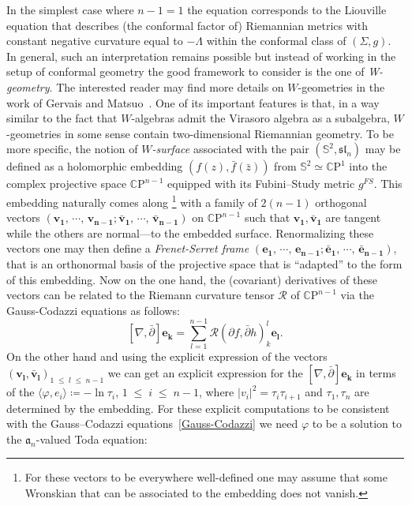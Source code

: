 \documentclass[10pt]{amsart}
\theoremstyle{definition}\newtheorem{defi}[theo]{Definition}\newtheorem{rema}[theo]{Remark}\newtheorem{exam}[theo]{Example}\newtheorem{exem}[theo]{Example}\newtheorem{nota}[theo]{Notation}
\renewcommand{\leq}{\;\leqslant\;}
\newcommand{\frksl}{\mathfrak{sl}}
\newcommand{\frka}{\mathfrak{a}}
\newcommand{\rmP}{\mathrm{P}}
\newcommand{\clR}{\mathcal{R}}
\newcommand{\C}{\mathbb{C}}
\renewcommand*\S{\mathbb{S}}
\newcommand{\ps}[1]{\langle #1 \rangle}
\newcommand{\norm}[1]{\left\lvert#1\right\rvert}
\begin{document}
In the simplest case where $n-1=1$ the equation corresponds to the Liouville equation that describes (the conformal factor of) Riemannian metrics with constant negative curvature equal to $-\Lambda$ within the conformal class of $(\Sigma,g)$. In general, such an interpretation remains possible but instead of working in the setup of conformal geometry the good framework to consider is the one of \emph{W-geometry}. The interested reader may find more details on $W$-geometries in the work of Gervais and Matsuo~\cite{GeMa92}. One of its important features is that, in a way similar to the fact that $W$-algebras admit the Virasoro algebra as a subalgebra, $W$-geometries in some sense contain two-dimensional Riemannian geometry. To be more specific, the notion of \emph{$W$-surface} associated with the pair $(\S^2,\frksl_n)$ may be defined as a holomorphic embedding $(f(z), \bar f(\bar z))$ from $\S^2\simeq \C \rmP^1$ into the complex projective space $\C \rmP^{n-1}$ equipped with its Fubini--Study metric $g^{FS}$. This embedding naturally comes along
\footnote{For these vectors to be everywhere well-defined one may assume that some Wronskian that can be associated to the embedding does not vanish.} with a family of $2(n-1)$ orthogonal vectors $(\bm{v_1},\,\cdots,\,\bm{v_{n-1}};\bm{\bar v_1},\,\cdots,\,\bm{\bar v_{n-1}})$ on $\C \rmP^{n-1}$ such that $\bm{v_1},\bm{\bar v_1}$ are tangent while the others are normal---to the embedded surface. Renormalizing these vectors one may then define a \emph{Frenet-Serret frame} $(\bm{e_1},\,\cdots,\,\bm{e_{n-1}};\bm{\bar e_1},\,\cdots,\,\bm{\bar e_{n-1}})$, that is an orthonormal basis of the projective space that is ``adapted'' to the form of this embedding. Now on the one hand, the (covariant) derivatives of these vectors can be related to the Riemann curvature tensor $\clR$ of $\C\rmP^{n-1}$ via the Gauss-Codazzi equations as follows:
\begin{equation}\label{Gauss-Codazzi}
\left[\nabla,\bar\partial\right]\bm{e_k}=\sum_{l=1}^{n-1}\clR\left(\partial f,\bar\partial h\right)_k^l\bm{e_l}.
\end{equation}
On the other hand and using the explicit expression of the vectors $(\bm{v_l},\bm{\bar v_l})_{1\leq l\leq n-1}$ we can get an explicit expression for the $[\nabla,\bar\partial]\bm{e_k}$ in terms of the $\ps{\varphi,e_i}\coloneqq -\ln\tau_i$, $1\leq i\leq n-1$, where $\norm{v_i}^2=\tau_i\tau_{i+1}$ and $\tau_1,\tau_{n}$ are determined by the embedding. For these explicit computations to be consistent with the Gauss--Codazzi equations~\eqref{Gauss-Codazzi} we need $\varphi$ to be a solution to the $\frka_n$-valued Toda equation:
\end{document}
